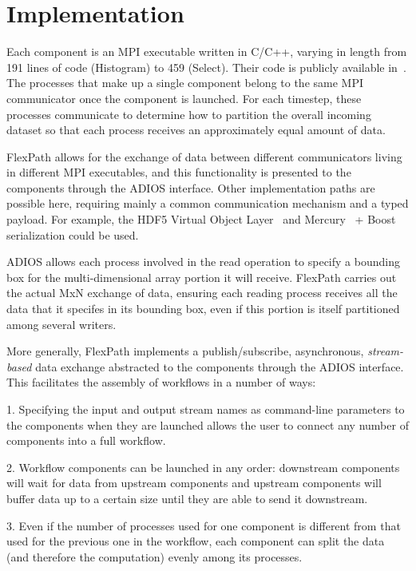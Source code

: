 \section{Implementation}
\label{s:impl}

Each component is an MPI executable
written in C/C++, varying in length from
191 lines of code (Histogram) to
459 (Select).
Their code is publicly available
in~\cite{champsaur:smartblock-repo}.
The processes that make up a single
component belong to the same MPI communicator
once the component is launched.
For each timestep, these processes
communicate to determine how to partition
the overall incoming dataset so that each
process receives an approximately
equal amount of data.

FlexPath allows for the exchange of data
between different communicators living
in different MPI executables, and this
functionality is presented
to the components through the ADIOS interface.
Other implementation paths
are possible here, requiring mainly a common communication
mechanism and a typed payload. For example, the HDF5 Virtual Object
Layer~\cite{folk:2011:hdf5} and Mercury~\cite{Soumagne:2013:mercury} +
Boost serialization could be used.

ADIOS allows each process
involved in the read operation to specify a
bounding box for the multi-dimensional
array portion it will receive.
FlexPath carries out the actual MxN exchange of data,
ensuring each reading process receives
all the data that it specifes in its bounding box,
even if this portion is itself partitioned among several writers.

More generally, FlexPath implements a publish/subscribe,
asynchronous, \textit{stream-based} data exchange abstracted to the
components through the ADIOS interface. This facilitates
the assembly of \sys workflows in a number of ways:

1. Specifying the input and output stream
names as command-line parameters to the \sys components 
when they are launched allows the user
to connect any number of components into
a full workflow.

2. Workflow components can be
launched in any order: downstream components
will wait for data from 
upstream components and upstream
components will buffer data up to a certain
size until they are able to send it
downstream.

3. Even if the number of processes used for one
component is different from that used for the previous
one in the workflow, each component can split the data
(and therefore the computation) evenly among its processes.

